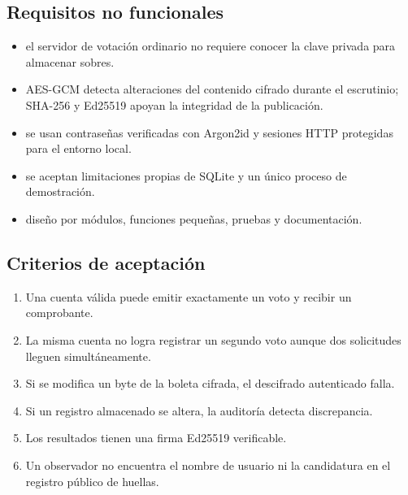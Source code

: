 \subsection{Requisitos no funcionales}
\begin{itemize}
\item {} el servidor de votación ordinario no requiere conocer la clave privada para almacenar sobres.
\item {} AES-GCM detecta alteraciones del contenido cifrado durante el escrutinio; SHA-256 y Ed25519 apoyan la integridad de la publicación.
\item {} se usan contraseñas verificadas con Argon2id y sesiones HTTP protegidas para el entorno local.
\item {} se aceptan limitaciones propias de SQLite y un único proceso de demostración.
\item {} diseño por módulos, funciones pequeñas, pruebas y documentación.
\end{itemize}

\subsection{Criterios de aceptación}
\begin{enumerate}
\item Una cuenta válida puede emitir exactamente un voto y recibir un comprobante.
\item La misma cuenta no logra registrar un segundo voto aunque dos solicitudes lleguen simultáneamente.
\item Si se modifica un byte de la boleta cifrada, el descifrado autenticado falla.
\item Si un registro almacenado se altera, la auditoría detecta discrepancia.
\item Los resultados tienen una firma Ed25519 verificable.
\item Un observador no encuentra el nombre de usuario ni la candidatura en el registro público de huellas.
\end{enumerate}
